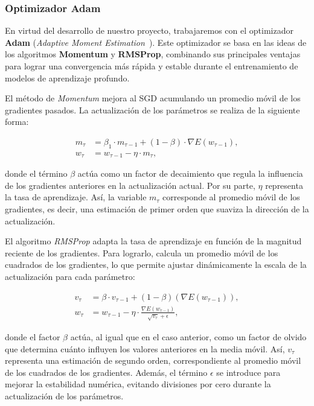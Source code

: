 \subsubsection{Optimizador Adam}\label{subsubsec:optimizador-adam}
En virtud del desarrollo de nuestro proyecto, trabajaremos con el optimizador \textbf{Adam} (\textit{Adaptive Moment Estimation}~\cite{Diederik2017}). Este optimizador se basa en las ideas de los algoritmos \textbf{Momentum} y \textbf{RMSProp}, combinando sus principales ventajas para lograr una convergencia más rápida y estable durante el entrenamiento de modelos de aprendizaje profundo.

El método de \textit{Momentum} mejora al SGD acumulando un promedio móvil de los gradientes pasados. La actualización de los parámetros se realiza de la siguiente forma:

\[
    \begin{aligned}
        m_{\tau} &= \beta_1 \cdot m_{\tau-1} + (1 - \beta) \cdot \nabla E(w_{\tau - 1}), \\
        w_{\tau} &= w_{\tau - 1} - \eta \cdot m_\tau,
    \end{aligned}
\]

donde el término $\beta$ actúa como un factor de decaimiento que regula la influencia de los gradientes anteriores en la actualización actual. Por su parte, $\eta$ representa la tasa de aprendizaje. Así, la variable $m_{\tau}$ corresponde al promedio móvil de los gradientes, es decir, una estimación de primer orden que suaviza la dirección de la actualización.

El algoritmo \textit{RMSProp} adapta la tasa de aprendizaje en función de la magnitud reciente de los gradientes. Para lograrlo, calcula un promedio móvil de los cuadrados de los gradientes, lo que permite ajustar dinámicamente la escala de la actualización para cada parámetro:

\[
    \begin{aligned}
        v_{\tau} &= \beta \cdot v_{\tau-1} + (1- \beta)(\nabla E(w_{\tau-1})), \\
        w_{\tau} &= w_{\tau-1} - \eta \cdot \frac{\nabla E(w_{\tau-1})}{\sqrt{v_{\tau}}+\epsilon},
    \end{aligned}
\]

donde el factor $\beta$ actúa, al igual que en el caso anterior, como un factor de olvido que determina cuánto influyen los valores anteriores en la media móvil. Así, $v_{\tau}$ representa una estimación de segundo orden, correspondiente al promedio móvil de los cuadrados de los gradientes. Además, el término $\epsilon$ se introduce para mejorar la estabilidad numérica, evitando divisiones por cero durante la actualización de los parámetros.

